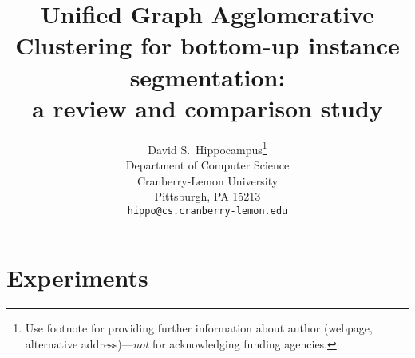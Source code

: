 \documentclass{article}
\title{Unified Graph Agglomerative Clustering for bottom-up instance segmentation: \\a review and comparison study}
\author{%
  David S.~Hippocampus\thanks{Use footnote for providing further information
    about author (webpage, alternative address)---\emph{not} for acknowledging
    funding agencies.} \\
  Department of Computer Science\\
  Cranberry-Lemon University\\
  Pittsburgh, PA 15213 \\
  \texttt{hippo@cs.cranberry-lemon.edu} \\
}
\begin{document}
\maketitle













\section{Experiments}









{\small


}

\end{document}
